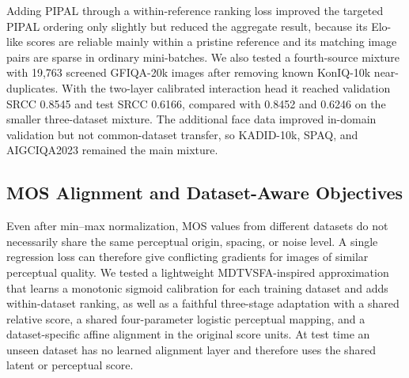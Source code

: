 \documentclass{article}
\begin{document}
Adding PIPAL through a within-reference ranking loss improved the targeted PIPAL ordering only slightly but reduced the aggregate result, because its Elo-like scores are reliable mainly within a pristine reference and its matching image pairs are sparse in ordinary mini-batches. We also tested a fourth-source mixture with 19,763 screened GFIQA-20k images after removing known KonIQ-10k near-duplicates. With the two-layer calibrated interaction head it reached validation SRCC 0.8545 and test SRCC 0.6166, compared with 0.8452 and 0.6246 on the smaller three-dataset mixture. The additional face data improved in-domain validation but not common-dataset transfer, so KADID-10k, SPAQ, and AIGCIQA2023 remained the main mixture.

\subsection{MOS Alignment and Dataset-Aware Objectives}

Even after min--max normalization, MOS values from different datasets do not necessarily share the same perceptual origin, spacing, or noise level. A single regression loss can therefore give conflicting gradients for images of similar perceptual quality. We tested a lightweight MDTVSFA-inspired approximation that learns a monotonic sigmoid calibration for each training dataset and adds within-dataset ranking, as well as a faithful three-stage adaptation with a shared relative score, a shared four-parameter logistic perceptual mapping, and a dataset-specific affine alignment in the original score units. At test time an unseen dataset has no learned alignment layer and therefore uses the shared latent or perceptual score.

\begin{table}[htbp]
\centering
\small
\setlength{\tabcolsep}{5pt}
\caption{Ablation of MOS alignment and dataset-aware losses on the three-dataset mixture.}
\label{tab:text-calibration}
\end{table}
\end{document}

